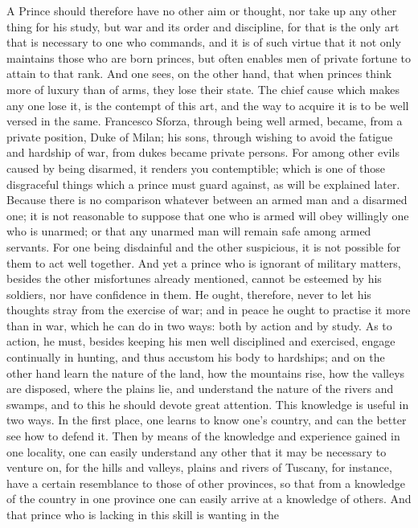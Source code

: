 \documentclass[12pt,letterpaper]{memoir}
\begin{document}
A Prince should therefore have no other aim or thought, nor take up
any other thing for his study, but war and its order and discipline,
for that is the only art that is necessary to one who commands, and
it is of such virtue that it not only maintains those who are born
princes, but often enables men of private fortune to attain to that
rank. And one sees, on the other hand, that when princes think more of
luxury than of arms, they lose their state. The chief cause which makes
any one lose it, is the contempt of this art, and the way to acquire
it is to be well versed in the same. Francesco Sforza, through being
well armed, became, from a private position, Duke of Milan; his sons,
through wishing to avoid the fatigue and hardship of war, from dukes
became private persons. For among other evils caused by being disarmed,
it renders you contemptible; which is one of those disgraceful things
which a prince must guard against, as will be explained later. Because
there is no comparison whatever between an armed man and a disarmed
one; it is not reasonable to suppose that one who is armed will obey
willingly one who is unarmed; or that any unarmed man will remain
safe among armed servants. For one being disdainful and the other
suspicious, it is not possible for them to act well together. And
yet a prince who is ignorant of military matters, besides the other
misfortunes already mentioned, cannot be esteemed by his soldiers, nor
have confidence in them. He ought, therefore, never to let his thoughts
stray from the exercise of war; and in peace he ought to practise it
more than in war, which he can do in two ways: both by action and by
study. As to action, he must, besides keeping his men well disciplined
and exercised, engage continually in hunting, and thus accustom his
body to hardships; and on the other hand learn the nature of the
land, how the mountains rise, how the valleys are disposed, where the
plains lie, and understand the nature of the rivers and swamps, and
to this he should devote great attention. This knowledge is useful in
two ways. In the first place, one learns to know one's country, and
can the better see how to defend it. Then by means of the knowledge
and experience gained in one locality, one can easily understand
any other that it may be necessary to venture on, for the hills and
valleys, plains and rivers of Tuscany, for instance, have a certain
resemblance to those of other provinces, so that from a knowledge of
the country in one province one can easily arrive at a knowledge of
others. And that prince who is lacking in this skill is wanting in the
\end{document}
